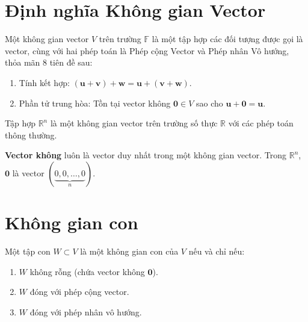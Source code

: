 
\section{Định nghĩa Không gian Vector}

\begin{dinhnghia}[K.G. Vector]
Một không gian vector $V$ trên trường $\mathbb{F}$ là một tập hợp các đối tượng được gọi là vector, cùng với hai phép toán là Phép cộng Vector và Phép nhân Vô hướng, thỏa mãn 8 tiên đề sau:
\begin{enumerate}
    \item Tính kết hợp: $(\mathbf{u} + \mathbf{v}) + \mathbf{w} = \mathbf{u} + (\mathbf{v} + \mathbf{w})$.
    \item Phần tử trung hòa: Tồn tại vector không $\mathbf{0} \in V$ sao cho $\mathbf{u} + \mathbf{0} = \mathbf{u}$.
\end{enumerate}
\end{dinhnghia}

\begin{vidu}
Tập hợp $\mathbb{R}^n$ là một không gian vector trên trường số thực $\mathbb{R}$ với các phép toán thông thường.
\end{vidu}

\begin{note}
\textbf{Vector không} luôn là vector duy nhất trong một không gian vector. Trong $\mathbb{R}^n$, $\mathbf{0}$ là vector $(\underbrace{0, 0, \dots, 0}_{n})$.
\end{note}

\section{Không gian con}

\begin{dinhly}
Một tập con $W \subset V$ là một không gian con của $V$ nếu và chỉ nếu:
\begin{enumerate}
    \item $W$ không rỗng (chứa vector không $\mathbf{0}$).
    \item $W$ đóng với phép cộng vector.
    \item $W$ đóng với phép nhân vô hướng.
\end{enumerate}
\end{dinhly}

